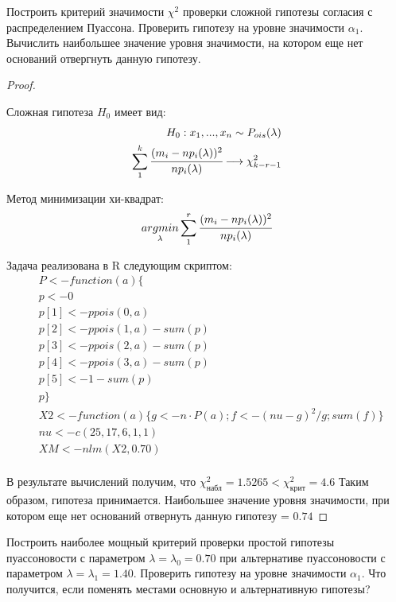 \begin{problem}
	Построить критерий значимости $\chi^2$ проверки сложной гипотезы согласия с распределением Пуассона. Проверить гипотезу на уровне значимости $\alpha_1$. Вычислить наибольшее значение уровня значимости, на котором еще нет оснований отвергнуть данную гипотезу. 
\end{problem}

\begin{proof}
	$ $
	
	Сложная гипотеза $H_0$ имеет вид:
	\begin{align}
		H_0: x_1,...,x_n \sim P_{ois}(\lambda) \\
		\sum\limits_1^k\cfrac{(m_i-np_i(\lambda))^2}{np_i(\lambda)}\longrightarrow\chi^2_{k-r-1}
	\end{align}	

	Метод минимизации хи-квадрат:
	\begin{equation}
		\underset{\lambda}{argmin}\sum\limits_1^r\cfrac{(m_i-np_i(\lambda))^2}{np_i(\lambda)}
	\end{equation}
	
	Задача реализована в R следующим скриптом:
	\begin{align}
		&P <- function(a)\{ \\
		&p <- 0\\
		&p[1] <- ppois(0, a)\\
		&p[2] <- ppois(1, a) - sum(p)\\
		&p[3] <- ppois(2, a) - sum(p)\\
		&p[4] <- ppois(3, a) - sum(p)\\
		&p[5] <- 1-sum(p)\\
		&p\}\\
		&X2 <- function(a)\{g <- n\cdot P(a); f <- (nu-g)^2/g; sum(f)\} \\
		&nu <- c(25, 17, 6, 1, 1) \\
		&XM <- nlm(X2, 0.70)\\
	\end{align}
	
	В результате вычислений получим, что $\chi^2_{\text{набл}}=1.5265<\chi^2_{\text{крит}}=4.6$ 
	Таким образом, гипотеза принимается. Наибольшее значение уровня значимости, при котором еще нет оснований отвернуть данную гипотезу = $0.74$	
\end{proof}


\begin{problem}
	Построить наиболее мощный критерий проверки простой гипотезы пуассоновости с параметром $\lambda=\lambda_0=0.70$ при альтернативе пуассоновости с параметром $\lambda=\lambda_1=1.40$. Проверить гипотезу на уровне значимости $\alpha_1$. Что получится, если поменять местами основную и альтернативную гипотезы?
\end{problem}

